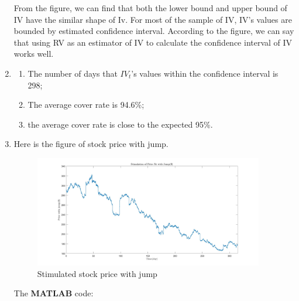 \documentclass[12pt,letterpaper]{article}
\begin{document}
\begin{enumerate}[label=\textbf{(\Alph*)}]
\begin{figure}[H]
        \end{figure}
From the figure, we can find that both the lower bound and upper bound of IV have the similar shape of Iv. For most of the sample of IV, IV's values are bounded by estimated confidence interval. According to the figure, we can say that using RV as an estimator of IV to calculate the confidence interval of IV works well.

\item 
\begin{enumerate}[label=(\roman*)]
    \item The number of days that $IV_t$'s values within the confidence interval is 298;
    \item The average cover rate is 94.6\%;
    \item the average cover rate is close to the expected 95\%.
\end{enumerate}
   
\item Here is the figure of stock price with jump.
\begin{figure}[H]
            \centering
            \includegraphics[width=10cm]{figures/p3_ex3_g.jpg}
            \caption{Stimulated stock price with jump}
        \end{figure}
 
The \textbf{MATLAB} code:
    
        

\end{enumerate}
\end{document}
